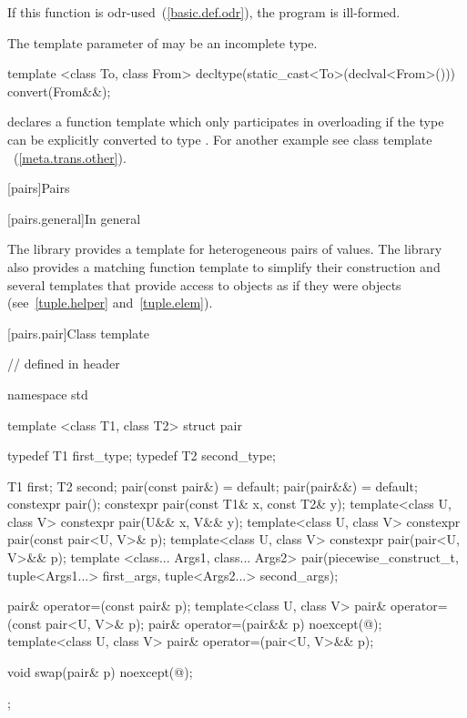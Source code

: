 \begin{itemdescr}
\pnum
\notes If this function is odr-used~(\ref{basic.def.odr}), the program is ill-formed.

\pnum
\notes The template parameter  of  may be an incomplete type.

\enterexample
\begin{codeblock}
template <class To, class From>
  decltype(static_cast<To>(declval<From>())) convert(From&&);
\end{codeblock}

declares a function template  which only participates in overloading if the
type  can be explicitly converted to type . For another example see class
template ~(\ref{meta.trans.other}).
\exitexample
\end{itemdescr}

[pairs]{Pairs}

[pairs.general]{In general}

\pnum
The library provides a template for heterogeneous pairs of values.
The library also provides a matching function template to simplify
their construction and several templates that provide access to 
objects as if they were  objects (see~\ref{tuple.helper}
and~\ref{tuple.elem}).%
%
%
%

[pairs.pair]{Class template }

%
\begin{codeblock}
// defined in header 

namespace std {
  template <class T1, class T2>
  struct pair {
    typedef T1 first_type;
    typedef T2 second_type;

    T1 first;
    T2 second;
    pair(const pair&) = default;
    pair(pair&&) = default;
    constexpr pair();
    constexpr pair(const T1& x, const T2& y);
    template<class U, class V> constexpr pair(U&& x, V&& y);
    template<class U, class V> constexpr pair(const pair<U, V>& p);
    template<class U, class V> constexpr pair(pair<U, V>&& p);
    template <class... Args1, class... Args2>
      pair(piecewise_construct_t,
           tuple<Args1...> first_args, tuple<Args2...> second_args);

    pair& operator=(const pair& p);
    template<class U, class V> pair& operator=(const pair<U, V>& p);
    pair& operator=(pair&& p) noexcept(@\seebelow@);
    template<class U, class V> pair& operator=(pair<U, V>&& p);

    void swap(pair& p) noexcept(@\seebelow@);
  };
}
\end{codeblock}

